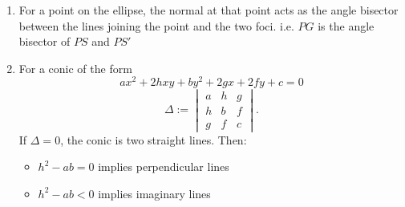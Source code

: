 \documentclass{article}
\numberwithin{equation}{section}
\numberwithin{figure}{section}
\begin{document}
\begin{enumerate}
		\item For a point on the ellipse, the normal at that point acts as the angle bisector between the lines joining the point and the two foci.
			i.e. $PG$ is the angle bisector of $PS$ and $PS'$
		\item For a conic of the form 
			\begin{equation*}
				ax^2+2hxy+by^2+2gx+2fy+c=0
			\end{equation*}
			\begin{equation}	
				\Delta :=
			\begin{vmatrix}
						a & h & g\\
						h & b & f\\
						g & f & c
			\end{vmatrix}.
			\end{equation}
		If $\Delta=0$, the conic is two straight lines. Then:
		\begin{itemize}
			\item $h^2-ab=0$ implies perpendicular lines
			\item $h^2-ab<0$ implies imaginary lines
		\end{itemize}
				
\end{enumerate}
\end{document}
